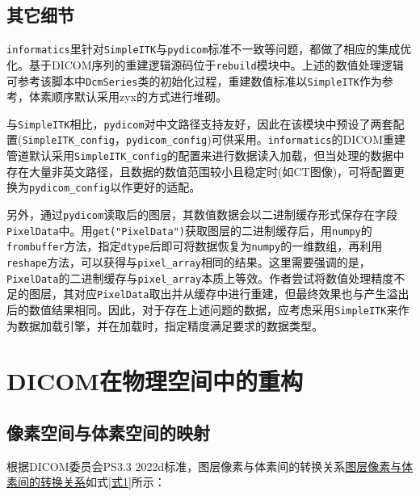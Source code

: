 \documentclass{ctexart}
\begin{document}
\subsection{其它细节}

\verb|informatics|里针对\verb|SimpleITK|与\verb|pydicom|标准不一致等问题，都做了相应的集成优化。基于DICOM序列的重建逻辑源码位于\verb|rebuild|模块中。上述的数值处理逻辑可参考该脚本中\verb|DcmSeries|类的初始化过程，重建数值标准以\verb|SimpleITK|作为参考，体素顺序默认采用zyx的方式进行堆砌。\par

与\verb|SimpleITK|相比，\verb|pydicom|对中文路径支持友好，因此在该模块中预设了两套配置(\verb|SimpleITK_config|，\verb|pydicom_config|)可供采用。\verb|informatics|的DICOM重建管道默认采用\verb|SimpleITK_config|的配置来进行数据读入加载，但当处理的数据中存在大量非英文路径，且数据的数值范围较小且稳定时(如CT图像)，可将配置更换为\verb|pydicom_config|以作更好的适配。\par

另外，通过\verb|pydicom|读取后的图层，其数值数据会以二进制缓存形式保存在字段\verb|PixelData|中。用\verb|get("PixelData")|获取图层的二进制缓存后，用\verb|numpy|的\verb|frombuffer|方法，指定\verb|dtype|后即可将数据恢复为\verb|numpy|的一维数组，再利用\verb|reshape|方法，可以获得与\verb|pixel_array|相同的结果。这里需要强调的是，\verb|PixelData|的二进制缓存与\verb|pixel_array|本质上等效。作者尝试将数值处理精度不足的图层，其对应\verb|PixelData|取出并从缓存中进行重建，但最终效果也与产生溢出后的数值结果相同。因此，对于存在上述问题的数据，应考虑采用\verb|SimpleITK|来作为数据加载引擎，并在加载时，指定精度满足要求的数据类型。\par


\section{DICOM在物理空间中的重构}

\subsection{像素空间与体素空间的映射}

根据DICOM委员会PS3.3 2022d标准，图层像素与体素间的转换关系\href{https://dicom.nema.org/medical/dicom/current/output/chtml/part03/sect_C.7.6.2.html#sect_C.7.6.2.1.1}{图层像素与体素间的转换关系}如式\ref{式1}所示：\par
\end{document}
